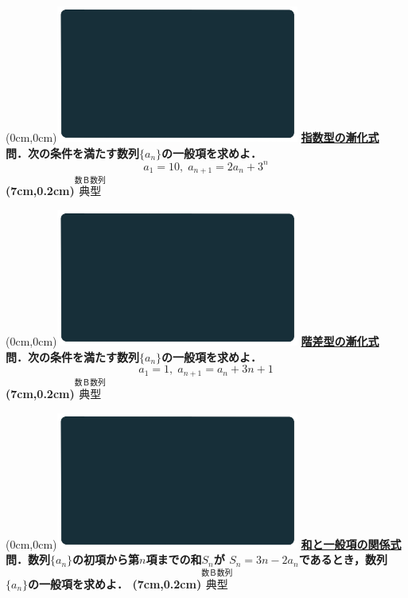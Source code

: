 \documentclass[10pt,
fleqn,
dvipdfmx,
uplatex
]{jsarticle}
\begin{document}
\at(0cm,0cm){\includegraphics[width=8cm,bb=0 0 1920 1080]{./media_local/smart_background/数B数列.jpeg}}
{\color{orange}\bf\boldmath\Large\underline{指数型の漸化式}}\vspace{0.3zw}\\
\Large 
\bf\boldmath 問．次の条件を満たす数列$\{a_n\}$の一般項を求めよ．
\[a_1={10},\;a_{n+1}=2a_n+3^n\]
\at(7cm,0.2cm){\small\color{bradorange}$\overset{\text{数Ｂ数列}}{\text{典型}}$}


\newpage



\at(0cm,0cm){\includegraphics[width=8cm,bb=0 0 1920 1080]{./media_local/smart_background/数B数列.jpeg}}
{\color{orange}\bf\boldmath\Large\underline{階差型の漸化式}}\vspace{0.3zw}\\
\Large 
\bf\boldmath 問．次の条件を満たす数列$\{a_n\}$の一般項を求めよ．
\[a_1=1,\;a_{n+1}=a_n+3n+1\]
\at(7cm,0.2cm){\small\color{bradorange}$\overset{\text{数Ｂ数列}}{\text{典型}}$}


\newpage



\at(0cm,0cm){\includegraphics[width=8cm,bb=0 0 1920 1080]{./media_local/smart_background/数B数列.jpeg}}
{\color{orange}\bf\boldmath\Large\underline{和と一般項の関係式}}\vspace{0.3zw}\\
\Large 
\bf\boldmath 問．数列$\{a_n\}$の初項から第$n$項までの和$S_n$が
$S_n=3n-2a_n$であるとき，数列$\{a_n\}$の一般項を求めよ．
\at(7cm,0.2cm){\small\color{bradorange}$\overset{\text{数Ｂ数列}}{\text{典型}}$}
\end{document}

